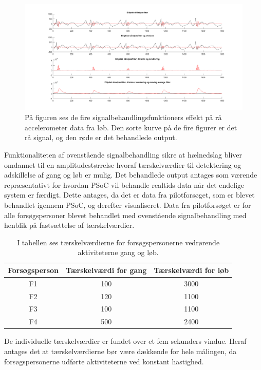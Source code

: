 \begin{figure}[H]
	\centering
	\includegraphics[scale=0.3]{figures/cDesign/signalbehandling_psoc.png}
	\caption{På figuren ses de fire signalbehandlingsfunktioners effekt på rå accelerometer data fra løb. Den sorte kurve på de fire figurer er det rå signal, og den røde er det behandlede output.}
	\label{fig:algoritme_cykling}
\end{figure}

Funktionaliteten af ovenstående signalbehandling sikre at hælnedslag bliver omdannet til en amplitudestørrelse hvoraf tærskelværdier til detektering og adskillelse af gang og løb er mulig. Det behandlede output antages som værende repræsentativt for hvordan PSoC vil behandle realtids data når det endelige system er færdigt. Dette antages, da det er data fra pilotforsøget, som er blevet behandlet igennem PSoC, og derefter visualiseret. Data fra pilotforsøget er for alle forsøgspersoner blevet behandlet med ovenstående signalbehandling med henblik på fastsættelse af tærskelværdier. 

\begin{table}[H]
	\centering
	\begin{tabular}{ccc}
		\hline
		\rowcolor[HTML]{C0C0C0} 
		Forsøgsperson & Tærskelværdi for gang & Tærskelværdi for løb \\ \hline
		\rowcolor[HTML]{FFFFFF} 
		F1 & 100 & 3000 \\ \hline
		\rowcolor[HTML]{FFFFFF} 
		F2 & 120 & 1100 \\ \hline
		\rowcolor[HTML]{FFFFFF} 
		F3 & 100 & 1100 \\ \hline
		\rowcolor[HTML]{FFFFFF} 
		F4 & 500 & 2400 \\ \hline
	\end{tabular}
	\caption{I tabellen ses tærskelværdierne for forsøgspersonerne vedrørende aktiviteterne gang og løb.}
	\label{tab:individuel_taerskel}
\end{table}\vspace{-0.5cm}
De individuelle tærskelværdier er fundet over et fem sekunders vindue. Heraf antages det at tærskelværdierne bør være dækkende for hele målingen, da forsøgspersonerne udførte aktiviteterne ved konstant hastighed.   

